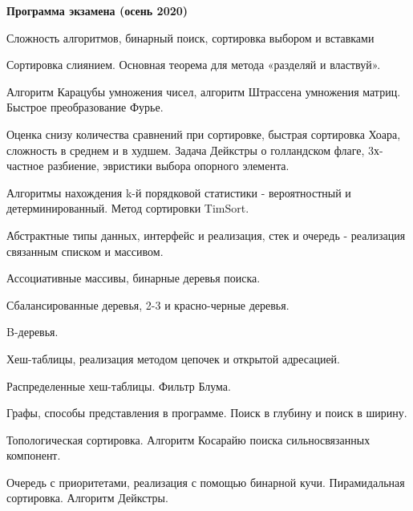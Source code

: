 \documentclass[specialist, subf, href, colorlinks=true, 12pt, times, mtpro, final]{disser}
\begin{document}
\tableofcontents

\newpage
{\Large \bf Программа экзамена (осень 2020)}

\begin{enumerate}
{\footnotesize
\item Сложность алгоритмов, бинарный поиск, сортировка выбором и вставками
\item Сортировка слиянием. Основная теорема для метода «разделяй и властвуй».
\item Алгоритм Карацубы умножения чисел, алгоритм Штрассена умножения матриц. Быстрое преобразование Фурье.
\item Оценка снизу количества сравнений при сортировке, быстрая сортировка Хоара, сложность в среднем и в худшем. Задача Дейкстры о голландском флаге, 3х-частное разбиение, эвристики выбора опорного элемента.
\item Алгоритмы нахождения k-й порядковой статистики - вероятностный и детерминированный. Метод сортировки TimSort.
\item Абстрактные типы данных, интерфейс и реализация, стек и очередь - реализация связанным списком и массивом.
\item Ассоциативные массивы, бинарные деревья поиска.
\item Сбалансированные деревья, 2-3 и красно-черные деревья.
\item B-деревья.
\item Хеш-таблицы, реализация методом цепочек и открытой адресацией.
\item Распределенные хеш-таблицы. Фильтр Блума.
\item Графы, способы представления в программе. Поиск в глубину и поиск в ширину.
\item Топологическая сортировка. Алгоритм Косарайю поиска сильносвязанных компонент.
\item Очередь с приоритетами, реализация с помощью бинарной кучи. Пирамидальная сортировка. Алгоритм Дейкстры.
}
\end{enumerate}
\end{document}
